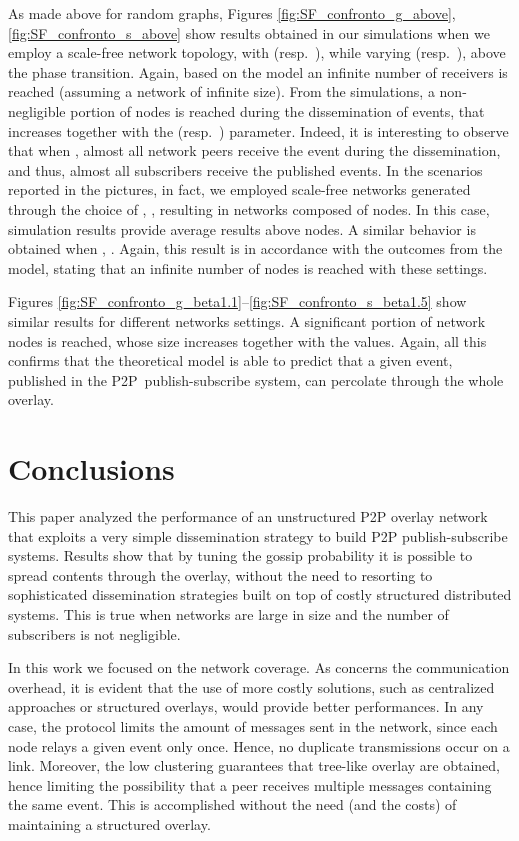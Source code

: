 \documentclass[10pt, conference, compsocconf]{IEEEtran}
\begin{document}
As made above for random graphs, Figures \ref{fig:SF_confronto_g_above}, \ref{fig:SF_confronto_s_above} show results obtained in our simulations when we employ a scale-free network topology, with  (resp.~), while varying  (resp.~), above the phase transition. Again, based on the model an infinite number of receivers is reached (assuming a network of infinite size). From the simulations, a non-negligible portion of nodes is reached during the dissemination of events, that increases together with the  (resp.~) parameter. 
Indeed, it is interesting to observe that when ,  almost all network peers receive the event during the dissemination, and thus, almost all subscribers receive the published events. In the scenarios reported in the pictures, in fact, we employed scale-free networks generated through the choice of , , resulting in networks composed of  nodes. In this case, simulation results provide average results above  nodes.
A similar behavior is obtained when , .
Again, this result is in accordance with the outcomes from the model, stating that an infinite number of nodes is reached with these settings.

Figures \ref{fig:SF_confronto_g_beta1.1}--\ref{fig:SF_confronto_s_beta1.5} show similar results for different networks settings. A significant portion of network nodes is reached, whose size increases together with the  values. Again, all this confirms that the theoretical model is able to predict that a given event, published in the \ac{P2P}~publish-subscribe system, can percolate through the whole overlay.

\section{Conclusions}\label{sec:conc}

This paper analyzed the performance of an unstructured P2P overlay network that exploits a very simple dissemination strategy to build \ac{P2P} publish-subscribe systems. 
Results show that by tuning the gossip probability it is possible to spread contents through the overlay, without the need to resorting to sophisticated dissemination strategies built on top of costly structured distributed systems.
This is true when networks are large in size and the number of subscribers is not negligible.

In this work we focused on the network coverage. As concerns the communication overhead,
it is evident that the use of more costly solutions, such as centralized approaches or structured overlays, would provide better performances. In any case, the protocol limits the amount of messages sent in the network, since each node relays a given event only once. Hence, no duplicate transmissions occur on a link. Moreover, the low clustering guarantees that tree-like overlay are obtained, hence limiting the possibility that a peer receives multiple messages containing the same event. This is accomplished without the need (and the costs) of maintaining a structured overlay.
\end{document}
